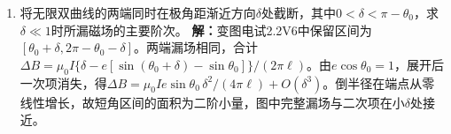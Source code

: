\documentclass[UTF8,fontset=fandol,a4paper,11pt]{ctexart}
\begin{document}
\begin{enumerate}
\item 将无限双曲线的两端同时在极角距渐近方向$\delta$处截断，其中$0<\delta<\pi-\theta_0$，求$\delta\ll1$时所漏磁场的主要阶次。
\textbf{解：}变图电试2.2V6中保留区间为$[\theta_0+\delta,2\pi-\theta_0-\delta]$。两端漏场相同，合计$\Delta B=\mu_0I\{\delta-e[\sin(\theta_0+\delta)-\sin\theta_0]\}/(2\pi\ell)$。由$e\cos\theta_0=1$，展开后一次项消失，得$\Delta B=\mu_0Ie\sin\theta_0\,\delta^2/(4\pi\ell)+O(\delta^3)$。倒半径在端点从零线性增长，故短角区间的面积为二阶小量，图中完整漏场与二次项在小$\delta$处接近。
\begin{center}\begin{minipage}{.98\linewidth}\centering
{}
\end{minipage}
\end{center}
\end{enumerate}
\end{document}
